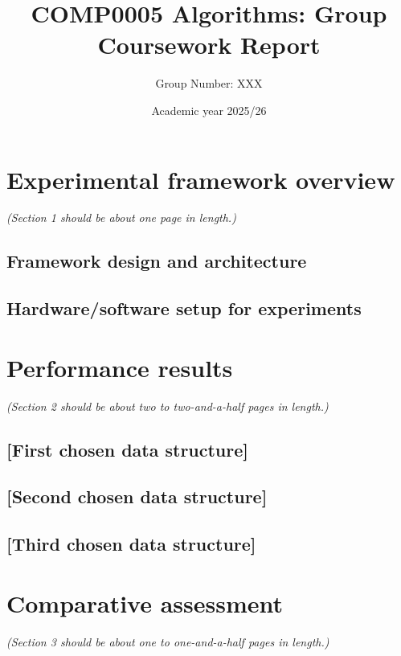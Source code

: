 \documentclass[12pt]{article}
\begin{document}
\title{COMP0005 Algorithms: Group Coursework Report}
\author{Group Number: XXX}
\date{Academic year 2025/26}
\maketitle



\section{Experimental framework overview}
\emph{(Section 1 should be about one page in length.)}

\subsection{Framework design and architecture}

\subsection{Hardware/software setup for experiments}




\section{Performance results}
\emph{(Section 2 should be about two to two-and-a-half pages in length.)}

\subsection{[First chosen data structure]}

\subsection{[Second chosen data structure]}

\subsection{[Third chosen data structure]}




\section{Comparative assessment}
\emph{(Section 3 should be about one to one-and-a-half pages in length.)}
\end{document}
